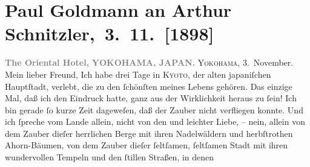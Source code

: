 

         
         \renewcommand{\erwaehntePersonen}{Personen: Marie Reinhard}
         \renewcommand{\erwaehnteOrte}{Orte: Japan, Kyoto, The Oriental Hotel, Wien, Yokohama}
         \renewcommand{\erwaehnteWerke}{}
               \section[ Paul Goldmann an Arthur Schnitzler, 3. 11. {[}1898{]}]{ Paul Goldmann an Arthur Schnitzler, 3. 11. {[}1898{]}}\nopagebreak{}\rehead{ }\begin{ledgroupsized}[t]{13cm}\normalsize\beginnumbering \toendnotes[C]{\smallbreak\pagebreak[2]} 
\toendnotes[C]{\smallbreak}\pstart
           \noindent{}{\pb}\textcolor{gray}{\textbf{The Oriental Hotel,}}\pend
           \pstart
           \textcolor{gray}{\textbf{YOKOHAMA, JAPAN.}}\pend
           \pstart
           \raggedleft{}\textsc{Yokohama}, 3. November.\pend
           \pstart\center{}Mein lieber Freund,\pend\pstart
           Ich habe drei Tage in \textsc{Kyoto}, der alten japaniſchen Hauptſtadt, verlebt, die zu den ſchönſten
               meines Lebens gehören. Das einzige Mal, daß ich den Eindruck hatte, ganz aus der
               Wirklichkeit heraus zu ſein! Ich bin gerade ſo kurze Zeit dageweſen, daß der Zauber
               nicht verfliegen konnte. Und ich ſpreche vom Lande allein,  nicht von den \label{K_L02864-1v}\label{K_L02864-1h} und leichter Liebe, – nein, allein von dem Zauber dieſer
               herrlichen Berge mit ihren Nadelwäldern und herbſtrothen Ahorn-Bäumen, von dem {\pb}Zauber dieſer ſeltſamen, ſeltſamen Stadt mit ihren wundervollen  Tempeln und den ſtillen Straßen, in denen

\end{ledgroupsized}
